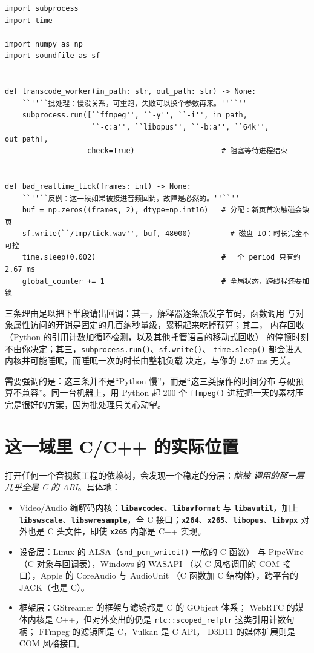 \documentclass[12pt,a4paper,fontset=fandol]{ctexbook}
\newcommand{\Fn}[1]{\texttt{#1()}}
\newcommand{\Tp}[1]{\texttt{#1}}
\newcommand{\Bk}{\discretionary{}{}{}}
\newcommand{\Lib}[1]{\textbf{\texttt{#1}}}
\newcommand{\Lang}[1]{\textsf{#1}}
\newcommand{\CL}{\Lang{C}}
\newcommand{\CPP}{\Lang{C++}}
\newcommand{\PY}{\Lang{Python}}
\newcommand{\DomAud}{\Lang{Audio}}
\newcommand{\DomVid}{\Lang{Video}}
\begin{document}
\begin{lstlisting}[style=pythonstyle,
  caption={同一个文件里的两种命运：上半段是合格的批处理编排，下半段是不能上生产的反例},
  label={lst:ch01-py-batch}]
import subprocess
import time

import numpy as np
import soundfile as sf


def transcode_worker(in_path: str, out_path: str) -> None:
    ``''``批处理：慢没关系，可重跑，失败可以换个参数再来。''``''
    subprocess.run([``ffmpeg'', ``-y'', ``-i'', in_path,
                    ``-c:a'', ``libopus'', ``-b:a'', ``64k'', out_path],
                   check=True)                    # 阻塞等待进程结束


def bad_realtime_tick(frames: int) -> None:
    ``''``反例：这一段如果被接进音频回调，故障是必然的。''``''
    buf = np.zeros((frames, 2), dtype=np.int16)   # 分配：新页首次触碰会缺页
    sf.write(``/tmp/tick.wav'', buf, 48000)         # 磁盘 IO：时长完全不可控
    time.sleep(0.002)                             # 一个 period 只有约 2.67 ms
    global_counter += 1                           # 全局状态，跨线程还要加锁
\end{lstlisting}

三条理由足以把下半段请出回调：其一，解释器逐条派发字节码，函数调用
与对象属性访问的开销是固定的几百纳秒量级，累积起来吃掉预算；其二，
内存回收（\PY{} 的引用计数加循环检测，以及其他托管语言的移动式回收）
的停顿时刻不由你决定；其三，\Fn{subprocess.run}、\Fn{sf.write}、
\Fn{time.sleep} 都会进入内核并可能睡眠，而睡眠一次的时长由整机负载
决定，与你的 2.67 ms 无关。

需要强调的是：这三条并不是``\PY{} 慢''，而是``这三类操作的时间分布
与硬预算不兼容''。同一台机器上，用 \PY{} 起 200 个 \Fn{ffmpeg}
进程把一天的素材压完是很好的方案，因为批处理只关心动望。

\section{这一域里 \CL/\CPP{} 的实际位置}
\label{sec:ch01-where-cpp}

打开任何一个音视频工程的依赖树，会发现一个稳定的分层：\emph{能被
调用的那一层几乎全是 \CL{} 的 ABI}。具体地：
\begin{itemize}
  \item \DomVid{}/{\Bk}\DomAud{} 编解码内核：\Lib{libavcodec}、\Lib{libavformat} 与
        \Lib{libavutil}，加上 \Lib{libswscale}、\Lib{libswresample}，全 \CL{}
        接口；\Lib{x264}、\Lib{x265}、\Lib{libopus}、\Lib{libvpx}
        对外也是 \CL{} 头文件，即使 \Lib{x265} 内部是 \CPP{} 实现。
  \item 设备层：Linux 的 ALSA（\Fn{snd\_{\Bk}pcm\_{\Bk}writei} 一族的 \CL{} 函数）
        与 PipeWire（\CL{} 对象与回调表），Windows 的 WASAPI
        （以 \CL{} 风格调用的 COM 接口），Apple 的 CoreAudio 与 AudioUnit
        （\CL{} 函数加 \CL{} 结构体），跨平台的 JACK（也是 \CL{}）。
  \item 框架层：GStreamer 的框架与滤镜都是 \CL{} 的 GObject 体系；
        WebRTC 的媒体内核是 \CPP{}，但对外交出的仍是
        \Tp{rtc::scoped\_refptr} 这类引用计数句柄；
        FFmpeg 的滤镜图是 \CL{}，Vulkan 是 \CL{} API，
        D3D11 的媒体扩展则是 COM 风格接口。
\end{itemize}
\end{document}
